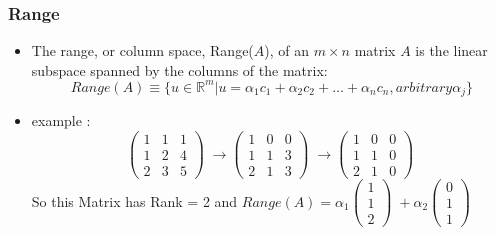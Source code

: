 \documentclass{beamer}
\begin{document}
\begin{frame}
	\frametitle{Range}
         \begin{itemize}
\item The range, or column space, Range($A$), of an $m \times n$ matrix $A$ is the linear
subspace spanned by the columns of the matrix:
			 $$ Range(A) \equiv \{u \in \mathbb{R}^{m} | u = \alpha_1 c_1 + \alpha_2 c_2 + \hdots + \alpha_n c_n , arbitrary \alpha_j \} $$
		 \pause
		 \item example : 
		 $$
			 \begin{pmatrix} 1 & 1 & 1 \\ 1 & 2 & 4 \\ 2 & 3 & 5 \end{pmatrix} \; 
				 \rightarrow
			 \begin{pmatrix} 1 & 0 & 0 \\ 1 & 1 & 3 \\ 2 & 1 & 3 \end{pmatrix} \; 
		         \rightarrow
		         \begin{pmatrix} 1 & 0 & 0 \\ 1 & 1 & 0 \\ 2 & 1 & 0 \end{pmatrix} \; $$
		 \pause
				 So this Matrix has Rank = 2 and $ Range (A) = \alpha_1 \begin{pmatrix} 1\\ 1 \\ 2 \end{pmatrix} \; +   \alpha_2 \begin{pmatrix} 0\\ 1 \\ 1 \end{pmatrix} \; $
	 \end{itemize}
\end{frame}
\end{document}
